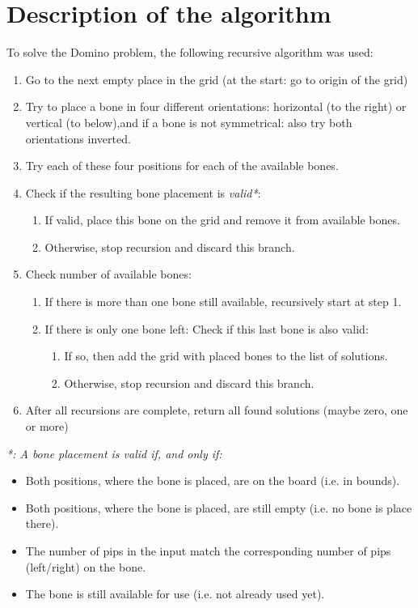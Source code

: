 \documentclass[a4paper, 11pt]{article}
\begin{document}
\section{Description of the algorithm}
To solve the Domino problem, the following recursive algorithm was used: 
\begin{enumerate}\setlength\itemsep{-1mm}
    \item Go to the next empty place in the grid (at the start: go to origin of the grid)
    \item Try to place a bone in four different orientations: horizontal (to the right) or vertical (to below),\newline and if a bone is not symmetrical: also try both orientations inverted.
    \item Try each of these four positions for each of the available bones.
    \item Check if the resulting bone placement is \textit{valid*}:
    \begin{enumerate}\setlength\itemsep{-1mm}
        \item If valid, place this bone on the grid and remove it from available bones.
        \item Otherwise, stop recursion and discard this branch.
    \end{enumerate}
    \item Check number of available bones:
    \begin{enumerate}\setlength\itemsep{-1mm}
            \item If there is more than one bone still available, recursively start at step 1. 
            \item If there is only one bone left: Check if this last bone is also valid:
            \begin{enumerate}\setlength\itemsep{-1mm}
            \item If so, then add the grid with placed bones to the list of solutions. 
            \item Otherwise, stop recursion and discard this branch.
            \end{enumerate}
    \end{enumerate}
    \item After all recursions are complete, return all found solutions (maybe zero, one or more)
\end{enumerate}
\vspace{5mm}
\textit{*: A bone placement is valid if, and only if:}
\begin{itemize}\setlength\itemsep{-1mm}
    \item Both positions, where the bone is placed, are on the board (i.e. in bounds).
    \item Both positions, where the bone is placed, are still empty (i.e. no bone is place there).
    \item The number of pips in the input match the corresponding number of pips (left/right) on the bone.
    \item The bone is still available for use (i.e. not already used yet).
\end{itemize}
\end{document}
